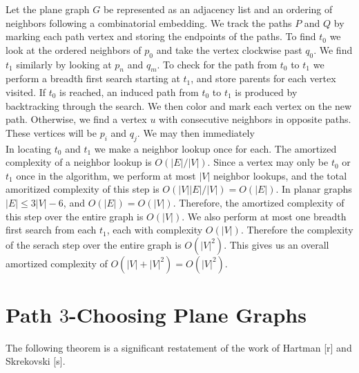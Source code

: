 \documentclass[11pt,letter]{article}
\begin{document}
Let the plane graph $G$ be represented as an adjacency list and an ordering of neighbors following a
combinatorial embedding. We track the paths $P$ and $Q$ by marking each path vertex and storing the endpoints
of the paths. To find $t_0$ we look at the ordered neighbors of $p_0$ and take the vertex clockwise past $q_0$.
We find $t_1$ similarly by looking at $p_n$ and $q_m$. To check for the path from $t_0$ to $t_1$ we perform a
breadth first search starting at $t_1$, and store parents for each vertex visited. If $t_0$ is reached, an induced path from $t_0$ 
to $t_1$ is produced by backtracking through the search. We then color and mark each vertex on the new path.
Otherwise, we find a vertex $u$ with consecutive neighbors in opposite paths. These vertices
will be $p_i$ and $q_j$. We may then immediately \\

\noindent In locating $t_0$ and $t_1$ we make a neighbor lookup once for each. The amortized complexity of a
neighbor lookup is $O(|E|/|V|)$. Since a vertex may only be $t_0$
or $t_1$ once in the algorithm, we perform at most $|V|$ neighbor lookups, and the total amoritized complexity
of this step is $O(|V||E|/|V|)=O(|E|)$. In planar graphs $|E|\le 3|V|-6$, and $O(|E|)=O(|V|)$. Therefore, the
amortized complexity of this step over the entire graph is $O(|V|)$. We also perform at most one breadth first
search from each $t_1$, each with complexity $O(|V|)$. Therefore the complexity of the serach step over the
entire graph is $O(|V|^2)$. This gives us an overall amortized complexity of $O(|V|+|V|^2)=O(|V|^2)$.

\section{Path $3$-Choosing Plane Graphs}

The following theorem is a significant restatement of the work of Hartman [r] and Skrekovski [s].\\
\end{document}
